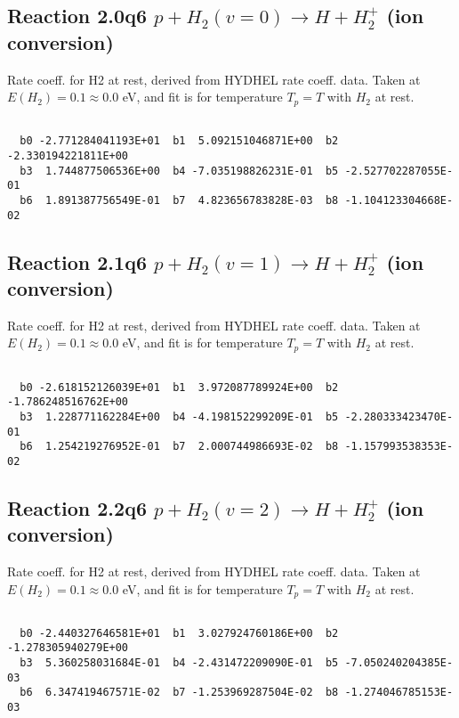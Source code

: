 \subsection{
Reaction 2.0q6
$ p + H_2(v=0) \rightarrow H + H_2^+$ (ion conversion)
}
Rate coeff. for H2 at rest, derived from HYDHEL rate coeff. data.
Taken at $E(H_2) = 0.1 \approx 0.0$ eV,  and fit is for temperature $T_p=T$ with $H_2$ at rest.

\begin{small}\begin{verbatim}

  b0 -2.771284041193E+01  b1  5.092151046871E+00  b2 -2.330194221811E+00
  b3  1.744877506536E+00  b4 -7.035198826231E-01  b5 -2.527702287055E-01
  b6  1.891387756549E-01  b7  4.823656783828E-03  b8 -1.104123304668E-02

\end{verbatim}\end{small}

\newpage
\subsection{
Reaction 2.1q6
$ p + H_2(v=1) \rightarrow H + H_2^+$ (ion conversion)
}
Rate coeff. for H2 at rest, derived from HYDHEL rate coeff. data.
Taken at $E(H_2) = 0.1 \approx 0.0$ eV,  and fit is for temperature $T_p=T$ with $H_2$ at rest.

\begin{small}\begin{verbatim}

  b0 -2.618152126039E+01  b1  3.972087789924E+00  b2 -1.786248516762E+00
  b3  1.228771162284E+00  b4 -4.198152299209E-01  b5 -2.280333423470E-01
  b6  1.254219276952E-01  b7  2.000744986693E-02  b8 -1.157993538353E-02

\end{verbatim}\end{small}

\newpage
\subsection{
Reaction 2.2q6
$ p + H_2(v=2) \rightarrow H + H_2^+$ (ion conversion)
}
Rate coeff. for H2 at rest, derived from HYDHEL rate coeff. data.
Taken at $E(H_2) = 0.1 \approx 0.0$ eV,  and fit is for temperature $T_p=T$ with $H_2$ at rest.

\begin{small}\begin{verbatim}

  b0 -2.440327646581E+01  b1  3.027924760186E+00  b2 -1.278305940279E+00
  b3  5.360258031684E-01  b4 -2.431472209090E-01  b5 -7.050240204385E-03
  b6  6.347419467571E-02  b7 -1.253969287504E-02  b8 -1.274046785153E-03

\end{verbatim}\end{small}

